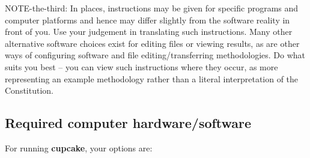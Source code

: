 NOTE-the-third: In places, instructions may be given for specific programs and computer platforms and hence may differ slightly from the software reality in front of you. Use your judgement in translating such instructions. Many other alternative software choices exist for editing files or viewing results, as are other ways of configuring software and file editing/transferring methodologies. Do what suits you best – you can view such instructions where they occur, as  more representing an example methodology rather than a literal interpretation of the Constitution.


\subsection*{Required computer hardware/software}

For running \textbf{cupcake}, your options are:

